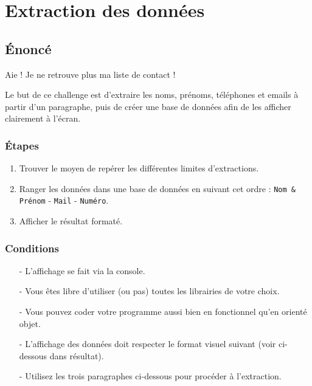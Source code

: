 \chapter{Extraction des données}
\vspace{2cm}
\section{Énoncé}
Aie ! Je ne retrouve plus ma liste de contact !
\medskip

Le but de ce challenge est d'extraire les noms, prénoms, téléphones et emails à partir d'un paragraphe, puis de créer une base de données afin de les afficher clairement à l'écran.
\medskip

\subsection*{Étapes}
\begin{enumerate}
	\item Trouver le moyen de repérer les différentes limites d'extractions.
	\item Ranger les données dans une base de données en suivant cet ordre : \texttt{Nom \& Prénom} - \texttt{Mail} - \texttt{Numéro}.
	\item Afficher le résultat formaté.
\end{enumerate}
\medskip

\subsection*{Conditions}
\begin{itemize}
	\item[-] L'affichage se fait via la console.
	\item[-] Vous êtes libre d'utiliser (ou pas) toutes les librairies de votre choix.
	\item[-] Vous pouvez coder votre programme aussi bien en fonctionnel qu'en orienté objet.
	\item[-] L'affichage des données doit respecter le format visuel suivant (voir ci-dessous dans résultat).
	\item[-] Utilisez les trois paragraphes ci-dessous pour procéder à l'extraction.
\end{itemize}
\medskip

